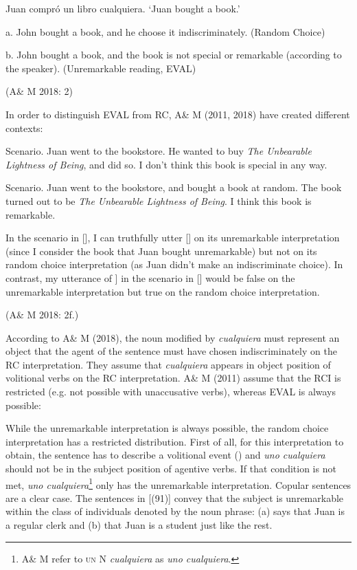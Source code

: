 \label{bkm:Ref533953640}  Juan compró un libro cualquiera. ‘Juan bought a book.’

  a.  John bought a book, and he choose it indiscriminately. (Random Choice)

  b.  John bought a book, and the book is not special or remarkable (according to the speaker). (Unremarkable reading, EVAL)

    (A\& M 2018: 2)

In order to distinguish EVAL from RC, A\& M (2011, 2018) have created different contexts:

\label{bkm:Ref54686706}  Scenario. Juan went to the bookstore. He wanted to buy \textit{The Unbearable Lightness of Being}, and did so. I don’t think this book is special in any way.

\label{bkm:Ref533953745}  Scenario. Juan went to the bookstore, and bought a book at random. The book turned out to be \textit{The Unbearable Lightness of Being}. I think this book is remarkable.

In the scenario in [], I can truthfully utter [] on its unremarkable interpretation (since I consider the book that Juan bought unremarkable) but not on its random choice interpretation (as Juan didn’t make an indiscriminate choice). In contrast, my utterance of ] in the scenario in [] would be false on the unremarkable interpretation but true on the random choice interpretation. 

(A\& M 2018: 2f.)

According to A\& M (2018), the noun modified by \textit{cualquiera} must represent an object that the agent of the sentence must have chosen indiscriminately on the RC interpretation. They assume that \textit{cualquiera} appears in object position of volitional verbs on the RC interpretation. A\& M (2011) assume that the RCI is restricted (e.g. not possible with unaccusative verbs), whereas EVAL is always possible:

While the unremarkable interpretation is always possible, the random choice interpretation has a restricted distribution. First of all, for this interpretation to obtain, the sentence has to describe a volitional event (\citealt{ChoiRomero2008}) and \textit{uno cualquiera} should not be in the subject position of agentive verbs. If that condition is not met, \textit{uno cualquiera}\footnote{{A\& M refer to} \textsc{un}{ }{N}{ \textit{cualquiera}} {as} {\textit{uno cualquiera}}.} only has the unremarkable interpretation. Copular sentences are a clear case. The sentences in [(91)] convey that the subject is unremarkable within the class of individuals denoted by the noun phrase: (a) says that Juan is a regular clerk and (b) that Juan is a student just like the rest.

